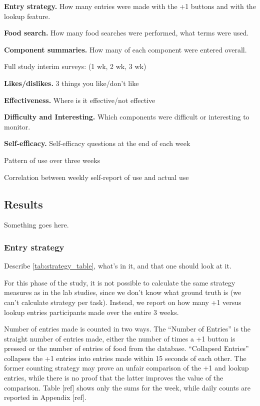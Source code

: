 \begin{enumerate*}
\item \textbf{Entry strategy. } How many entries were made with the +1 buttons and with the lookup feature. 
\item \textbf{Food search. } How many food searches were performed, what terms were used. 
\item \textbf{Component summaries. } How many of each component were entered overall. 
\item Full study interim surveys:  (1 wk, 2 wk, 3 wk)
\begin{itemize*}
\item \textbf{Likes/dislikes.} 3 things you like/don't like
\item \textbf{Effectiveness. } Where is it effective/not effective
\item \textbf{Difficulty and Interesting. }  Which components were difficult or interesting to monitor.
\item \textbf{Self-efficacy.} Self-efficacy questions at the end of each week
\end{itemize*}
\item Pattern of use over three weeks
\item Correlation between weekly self-report of use and actual use
\end{enumerate*}

\subsection{Results}
Something goes here. 


\subsubsection{Entry strategy}
Describe \ref{tab:strategy_table}, what's in it, and that one should look at it. 

For this phase of the study, it is not possible to calculate the same strategy measures as in the lab studies, since we don't know what ground truth is (we can't calculate strategy per task). Instead, we report on how many +1 versus lookup entries participants made over the entire 3 weeks. 

Number of entries made is counted in two ways. The ``Number of Entries'' is the straight number of entries made, either the number of times a +1 button is pressed or the number of entries of food from the database. ``Collapsed Entries'' collapses the +1 entries into entries made within 15 seconds of each other. The former counting strategy may prove an unfair comparison of the +1 and lookup entries, while there is no proof that the latter improves the value of the comparison. Table [ref] shows only the sums for the week, while daily counts are reported in Appendix [ref]. 

